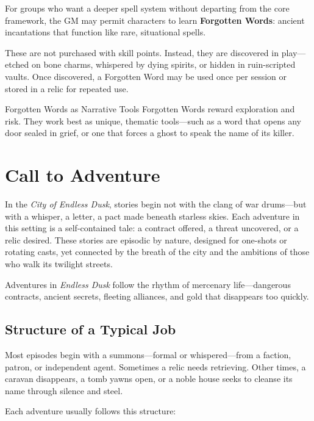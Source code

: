 For groups who want a deeper spell system without departing from the core framework, the GM may permit characters to learn \textbf{Forgotten Words}: ancient incantations that function like rare, situational spells.

These are not purchased with skill points. Instead, they are discovered in play—etched on bone charms, whispered by dying spirits, or hidden in ruin-scripted vaults. Once discovered, a Forgotten Word may be used once per session or stored in a relic for repeated use.

\begin{CommentBox}{Forgotten Words as Narrative Tools}
    Forgotten Words reward exploration and risk. They work best as unique, thematic tools—such as a word that opens any door sealed in grief, or one that forces a ghost to speak the name of its killer.
\end{CommentBox}

\section{Call to Adventure}

In the \textit{City of Endless Dusk}, stories begin not with the clang of war drums—but with a whisper, a letter, a pact made beneath starless skies. Each adventure in this setting is a self-contained tale: a contract offered, a threat uncovered, or a relic desired. These stories are episodic by nature, designed for one-shots or rotating casts, yet connected by the breath of the city and the ambitions of those who walk its twilight streets.

Adventures in \textit{Endless Dusk} follow the rhythm of mercenary life—dangerous contracts, ancient secrets, fleeting alliances, and gold that disappears too quickly.

\vspace{0.5\baselineskip}
\subsection*{Structure of a Typical Job}

Most episodes begin with a summons—formal or whispered—from a faction, patron, or independent agent. Sometimes a relic needs retrieving. Other times, a caravan disappears, a tomb yawns open, or a noble house seeks to cleanse its name through silence and steel.

Each adventure usually follows this structure:

